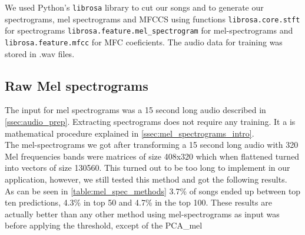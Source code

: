 We used Python's \texttt{librosa} library \cite{brian_mcfee_2019_2564164} to cut our songs and to generate our spectrograms, mel spectrograms and MFCCS using functions \texttt{librosa.core.stft} for spectrograms \texttt{librosa.feature.mel\_spectrogram} for mel-spectrograms and \texttt{librosa.feature.mfcc} for MFC coeficients. The audio data for training was stored in .wav files.

\subsection{Raw Mel spectrograms}\label{ssec:raw_mels}
The input for mel spectrograms was a 15 second long audio described in \ref{ssec:audio_prep}. Extracting spectrograms does not require any training. It a is mathematical procedure explained in \ref{ssec:mel_spectrograms_intro}. \\
The mel-spectrograms we got after transforming a 15 second long audio with 320 Mel frequencies bands were matrices of size 408x320 which when flattened turned into vectors of size 130560. This turned out to be too long to implement in our application, however, we still tested this method and got the following results. \\
As can be seen in \ref{table:mel_spec_methods} 3.7\% of songs ended up between top ten predictions, 4.3\% in top 50 and 4.7\% in the top 100. These results are actually better than any other method using mel-spectrograms as input was before applying the threshold, except of the PCA\_mel


